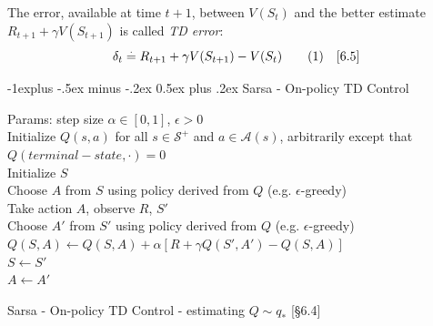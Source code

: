 \documentclass[10pt,landscape]{article}
\makeatletter
\renewcommand{\subsection}{\@startsection{subsection}{2}{0mm}%
                                {-1explus -.5ex minus -.2ex}%
                                {0.5ex plus .2ex}%
                                {\normalfont\normalsize\bfseries}}
\newcommand\numberthis{\addtocounter{equation}{1}\tag{\theequation}}
\makeatother
\begin{document}
\begin{multicols}{3}


The error, available at time $t+1$, between $V(S_t)$ and the better estimate $R_{t+1} + \gamma V(S_{t+1})$ is called \emph{TD error}:
\begin{equation*}
\delta_t \stackrel{.}{=} R_{t+1} + \gamma V(S_{t+1}) - V(S_t) \numberthis  \quad [6.5]
\end{equation*}

\subsection{Sarsa - On-policy TD Control}


\begin{algorithm}[H]
 Params: step size $\alpha \in [0,1]$, $\epsilon > 0$ \\
 Initialize $Q(s,a)$ for all $s \in \mathcal{S}^+$ and $a \in \mathcal{A}(s)$, arbitrarily except that $Q(terminal-state, \cdot) = 0$\\
{
    Initialize $S$\\
    Choose $A$ from $S$ using policy derived from $Q$ (e.g. $\epsilon$-greedy)\\
    {
      Take action $A$, observe $R$, $S'$\\
    	Choose $A'$ from $S'$ using policy derived from $Q$ (e.g. $\epsilon$-greedy)\\
      $Q(S, A) \leftarrow Q(S, A) + \alpha \left[R + \gamma Q(S', A') - Q(S, A)  \right]$\\
    	$S \leftarrow S'$\\
    	$A \leftarrow A'$ 
    }
 }
\caption{Sarsa - On-policy TD Control - estimating $Q \sim q_*$  [§6.4]}
\end{algorithm}


\end{multicols}
\end{document}

